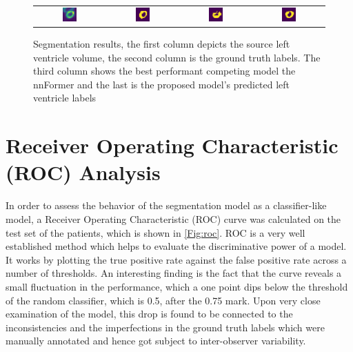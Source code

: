 \begin{figure}[htbp]
{\begin{tabular}{cccc}
\includegraphics[width=0.22\textwidth]{images/segs/sagittal_input.png} &
\includegraphics[width=0.22\textwidth]{images/segs/sagittal_gt.png} &
\includegraphics[width=0.22\textwidth]{images/segs/sagittal_pred.png}&
\includegraphics[width=0.22\textwidth]{images/segs/sagittal_pred_SP.png} \\
\end{tabular}
}
\caption{Segmentation results, the first column depicts the source left ventricle volume, the second column is the ground truth labels. The third column shows the best performant competing model the nnFormer and the last is the proposed model's predicted left ventricle labels}
\label{Fig:preds}
\end{figure}

\section{Receiver Operating Characteristic (ROC) Analysis}
In order to assess the behavior of the segmentation model as a classifier-like model, a Receiver Operating Characteristic (ROC) curve was calculated on the test set of the patients, which is shown in \cref{Fig:roc}. ROC is a very well established method which helps to evaluate the discriminative power of a model. It works by plotting the true positive rate against the false positive rate across a number of thresholds. An interesting finding is the fact that the curve reveals a small fluctuation in the performance, which a one point dips below the threshold of the random classifier, which is 0.5, after the 0.75 mark. Upon very close examination of the model, this drop is found to be connected to the inconsistencies and the imperfections in the ground truth labels which were manually annotated and hence got subject to inter-observer variability.

